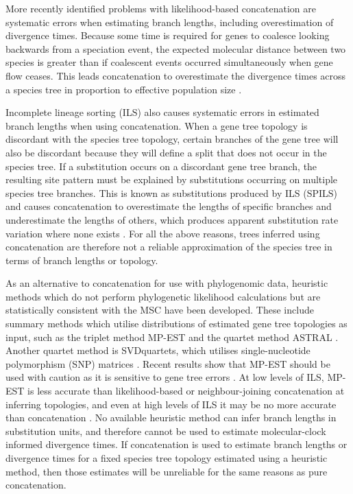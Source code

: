 \documentclass[12pt]{article}
\begin{document}
More recently identified problems with likelihood-based concatenation are
systematic errors when estimating branch lengths, including overestimation of
divergence times. Because some time is required for genes to coalesce
looking backwards from a speciation event, the expected molecular distance
between two species is greater than if coalescent events occurred
simultaneously when
gene flow ceases. This leads concatenation to overestimate the divergence
times across a species tree in proportion to effective population size
\citep{doi:10.1146/annurev.ecolsys.33.010802.150500, Ogilvie01052016}.

Incomplete lineage sorting (ILS) also causes systematic errors in estimated
branch lengths when using concatenation. When a gene tree topology is
discordant with the species tree topology, certain branches of the gene tree
will also be discordant because they will define a split that does not occur
in the species tree. If a substitution occurs on a discordant gene tree
branch, the resulting site pattern must be explained by substitutions
occurring on multiple species tree branches. This is known as substitutions
produced by ILS (SPILS) and causes concatenation to overestimate the lengths
of specific branches and underestimate the lengths of others, which produces
apparent substitution rate variation where none exists \citep{Mendes01072016}.
For all the above reasons, trees inferred using concatenation are therefore
not a reliable approximation of the species tree in terms of branch lengths or
topology.

As an alternative to concatenation for use with phylogenomic data, heuristic
methods which do not perform phylogenetic likelihood calculations but are statistically
consistent with the MSC have been developed. These include summary methods
which utilise distributions of estimated gene tree topologies as input, such as the
triplet method MP-EST \citep{Liu2010} and the quartet method ASTRAL
\citep{Mirarab01092014}. Another quartet method is SVDquartets, which
utilises single-nucleotide polymorphism (SNP) matrices
\citep{doi:10.1093/bioinformatics/btu530}. Recent results show that MP-EST
should be used with caution as it is sensitive to gene tree errors
\citep{Mirarab15062015, Xi201563}. At low levels of ILS, MP-EST is less
accurate than likelihood-based or neighbour-joining concatenation at inferring
topologies, and even at high levels of ILS it may be no more accurate than
concatenation \citep{Ogilvie01052016}. No available
heuristic method can infer branch lengths in substitution units, and
therefore cannot be used to estimate molecular-clock informed divergence
times. If concatenation is used to estimate branch lengths or divergence times
for a fixed species tree topology estimated using a heuristic method,
then those estimates will be unreliable for the same reasons as pure
concatenation.
\end{document}

